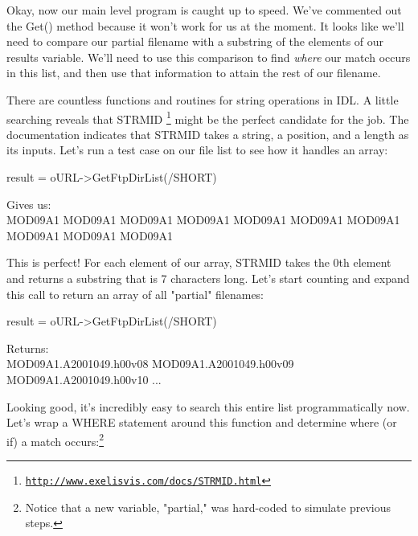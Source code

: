 \documentclass{book}
\newcounter{highlight}[page]
\newcommand{\tikzhighlightanchor}[1]{\ensuremath{\vcenter{\hbox{\tikz[remember picture, overlay]{\coordinate (#1 highlight \arabic{highlight});}}}}}
\newcommand{\bh}[0]{\stepcounter{highlight}\tikzhighlightanchor{begin}}
\newcommand{\eh}[0]{\tikzhighlightanchor{end}}
\theoremstyle{aside_style}
\newcommand{\link}[1]{\href{#1}{\nolinkurl{#1}}} %
\begin{document}
Okay, now our main level program is caught up to speed. We've commented out the Get() method because it won't work for us at the moment.
It looks like we'll need to compare our partial filename with a substring of the elements of our results variable.
We'll need to use this comparison to find \textit{where} our match occurs in this list, and then use that information to attain the rest of our filename.

There are countless functions and routines for string operations in IDL.
A little searching reveals that STRMID \footnote{\link{http://www.exelisvis.com/docs/STRMID.html}} might be the perfect candidate for the job.
The documentation indicates that STRMID takes a string, a position, and a length as its inputs.
Let's run a test case on our file list to see how it handles an array:

\begin{idl}
result = oURL->GetFtpDirList(/SHORT)

\end{idl}

Gives us:\\
MOD09A1 MOD09A1 MOD09A1 MOD09A1 MOD09A1 MOD09A1 MOD09A1 MOD09A1 MOD09A1 MOD09A1

This is perfect! For each element of our array, STRMID takes the 0th element and returns a substring that is 7 characters long. 
Let's start counting and expand this call to return an array of all "partial" filenames:

\begin{idl}
result = oURL->GetFtpDirList(/SHORT)

\end{idl}

Returns:\\
MOD09A1.A2001049.h00v08 \quad MOD09A1.A2001049.h00v09 \quad MOD09A1.A2001049.h00v10 \quad ... 

Looking good, it's incredibly easy to search this entire list programmatically now.
Let's wrap a WHERE statement around this function and determine where (or if) a match occurs:\footnote{Notice that a new variable, "partial," was hard-coded to simulate previous steps.}
\end{document}

